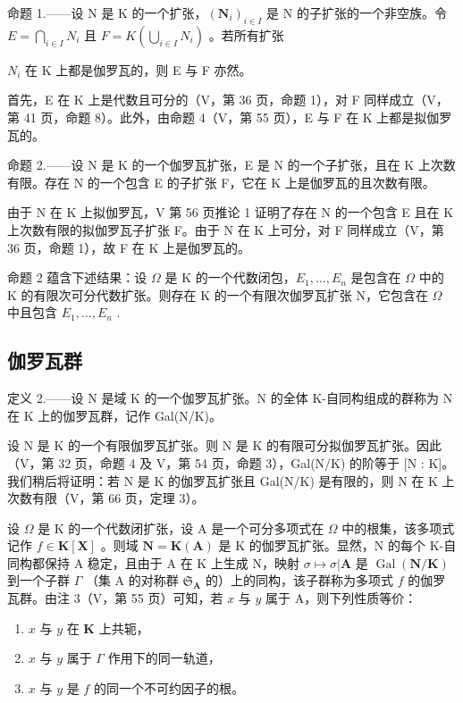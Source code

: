 命题 1.——设 N 是 K 的一个扩张，\((\mathbf{N}_{i})_{i\in I}\) 是 N 的子扩张的一个非空族。令 \(E=\bigcap_{i\in I}N_{i}\) 且 \(F=K\left(\bigcup_{i\in I}N_{i}\right)\) 。若所有扩张

\(N_{i}\) 在 K 上都是伽罗瓦的，则 E 与 F 亦然。

首先，E 在 K 上是代数且可分的（V，第 36 页，命题 1），对 F 同样成立（V，第 41 页，命题 8）。此外，由命题 4（V，第 55 页），E 与 F 在 K 上都是拟伽罗瓦的。

命题 2.——设 N 是 K 的一个伽罗瓦扩张，E 是 N 的一个子扩张，且在 K 上次数有限。存在 N 的一个包含 E 的子扩张 F，它在 K 上是伽罗瓦的且次数有限。

由于 N 在 K 上拟伽罗瓦，V 第 56 页推论 1 证明了存在 N 的一个包含 E 且在 K 上次数有限的拟伽罗瓦子扩张 F。由于 N 在 K 上可分，对 F 同样成立（V，第 36 页，命题 1），故 F 在 K 上是伽罗瓦的。

命题 2 蕴含下述结果：设 \(\Omega\) 是 K 的一个代数闭包，\(E_1, \ldots, E_n\) 是包含在 \(\Omega\) 中的 K 的有限次可分代数扩张。则存在 K 的一个有限次伽罗瓦扩张 N，它包含在 \(\Omega\) 中且包含 \(E_1, \ldots, E_n\) .

\subsection{伽罗瓦群}

定义 2.——设 N 是域 K 的一个伽罗瓦扩张。N 的全体 K-自同构组成的群称为 N 在 K 上的伽罗瓦群，记作 Gal(N/K)。

设 N 是 K 的一个有限伽罗瓦扩张。则 N 是 K 的有限可分拟伽罗瓦扩张。因此（V，第 32 页，命题 4 及 V，第 54 页，命题 3），Gal(N/K) 的阶等于 {[}N : K{]}。我们稍后将证明：若 N 是 K 的伽罗瓦扩张且 Gal(N/K) 是有限的，则 N 在 K 上次数有限（V，第 66 页，定理 3）。

设 \(\Omega\) 是 K 的一个代数闭扩张，设 A 是一个可分多项式在 \(\Omega\) 中的根集，该多项式记作 \(f \in \mathbf{K}[\mathbf{X}]\) 。则域 \(\mathbf{N} = \mathbf{K}(\mathbf{A})\) 是 K 的伽罗瓦扩张。显然，N 的每个 K-自同构都保持 A 稳定，且由于 A 在 K 上生成 N，映射 \(\sigma \mapsto \sigma | \mathbf{A}\) 是 \(\operatorname{Gal}(\mathbf{N} / \mathbf{K})\) 到一个子群 \(\Gamma\) （集 A 的对称群 \(\mathfrak{S}_{\mathbf{A}}\) 的）上的同构，该子群称为多项式 \(f\) 的伽罗瓦群。由注 3（V，第 55 页）可知，若 \(x\) 与 \(y\) 属于 A，则下列性质等价：

\begin{enumerate}
\def\labelenumi{\alph{enumi})}
\item
  \(x\) 与 \(y\) 在 \(\mathbf{K}\) 上共轭，
\item
  \(x\) 与 \(y\) 属于 \(\Gamma\) 作用下的同一轨道，
\item
  \(x\) 与 \(y\) 是 \(f\) 的同一个不可约因子的根。
\end{enumerate}

